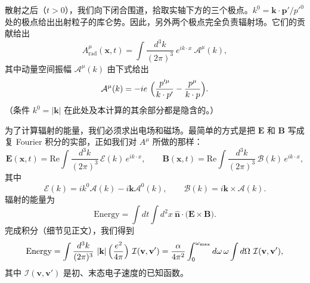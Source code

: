 散射之后（$t > 0$），我们向下闭合围道，拾取实轴下方的三个极点。$k^0 = \mathbf{k}\cdot\mathbf{p}'/p'^0$ 处的极点给出出射粒子的库仑势。因此，另外两个极点完全负责辐射场。它们的贡献给出
\begin{equation}
  A^\mu_{\mathrm{rad}}(\mathbf{x}, t) =
    \int \frac{d^3k}{(2\pi)^3}\ e^{ik\cdot x}\ \mathcal{A}^\mu(k),
  \label{eq:6.6}
\end{equation}
其中动量空间振幅 $\mathcal{A}^\mu(k)$ 由下式给出
\begin{equation}
  \mathcal{A}^\mu(k) = -ie\ \Bigl( \frac{p'^{\mu}}{k\cdot p'}
    - \frac{p^{\mu}}{k\cdot p} \Bigr).
  \label{eq:6.7}
\end{equation}
（条件 $k^0 = |\mathbf{k}|$ 在此处及本计算的其余部分都是隐含的。）

为了计算辐射的能量，我们必须求出电场和磁场。最简单的方式是把 $\mathbf{E}$ 和 $\mathbf{B}$ 写成复 Fourier 积分的实部，正如我们对 $A^\mu$ 所做的那样：
\begin{equation}
  \mathbf{E}(\mathbf{x},t) = \mathrm{Re}\int \frac{d^3k}{(2\pi)^3}\,
    \bm{\mathcal{E}}(k)\,e^{ik\cdot x},\qquad
  \mathbf{B}(\mathbf{x},t) = \mathrm{Re}\int \frac{d^3k}{(2\pi)^3}\,
    \bm{\mathcal{B}}(k)\,e^{ik\cdot x},
\end{equation}
其中
\begin{equation}
  \bm{\mathcal{E}}(k) = ik^0\bm{\mathcal{A}}(k)
    - i\mathbf{k}\mathcal{A}^0(k),\qquad
  \bm{\mathcal{B}}(k) = i\mathbf{k}\times\bm{\mathcal{A}}(k) .
\end{equation}
辐射的能量为
\begin{equation}
  \text{Energy} = \int dt \int d^2x\ \hat{\mathbf{n}}\cdot
    \bigl( \mathbf{E}\times\mathbf{B} \bigr) .
\end{equation}
完成积分（细节见正文），我们得到
\begin{equation}
  \text{Energy} = \int \frac{d^3k}{(2\pi)^3}\ |\mathbf{k}|\,
    \Bigl( \frac{e^2}{4\pi} \Bigr)\ \mathcal{I}(\mathbf{v}, \mathbf{v}')
  = \frac{\alpha}{4\pi^2}\int_0^{\omega_{\mathrm{max}}} d\omega\,
    \omega \int d\Omega\ \mathcal{I}(\mathbf{v}, \mathbf{v}'),
  \label{eq:6.12}
\end{equation}
其中 $\mathcal{I}(\mathbf{v},\mathbf{v}')$ 是初、末态电子速度的已知函数。

